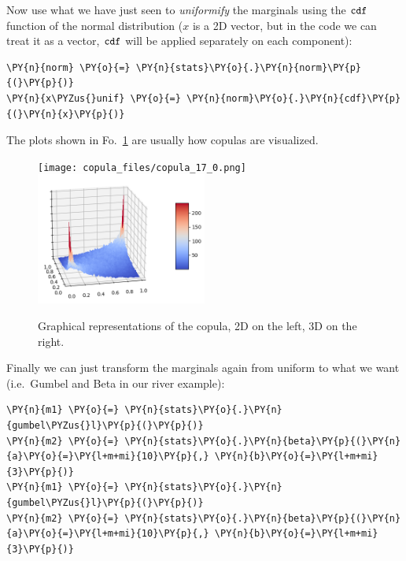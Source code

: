     Now use what we have just seen to \emph{uniformify} the marginals using
the \(\tt{cdf}\) function of the normal distribution (\(x\) is a 2D
vector, but in the code we can treat it as a vector, \(\tt{cdf}\) will
be applied separately on each component):

\begin{tcolorbox}[breakable, size=fbox, boxrule=1pt, pad at break*=1mm,colback=cellbackground, colframe=cellborder]
\begin{Verbatim}[commandchars=\\\{\}]
\PY{n}{norm} \PY{o}{=} \PY{n}{stats}\PY{o}{.}\PY{n}{norm}\PY{p}{(}\PY{p}{)}
\PY{n}{x\PYZus{}unif} \PY{o}{=} \PY{n}{norm}\PY{o}{.}\PY{n}{cdf}\PY{p}{(}\PY{n}{x}\PY{p}{)}
\end{Verbatim}
\end{tcolorbox}

The plots shown in Fo.~\ref{fig:copula} are usually how copulas are visualized.

    \begin{figure}
    \centering
    \texttt{[image: copula\_files/copula\_17\_0.png]}
    \quad
    \includegraphics[width=0.5\textwidth]{copula_3d.png}
    \caption{Graphical representations of the copula, 2D on the left, 3D on the right.}
    \label{fig:copula}
    \end{figure}

Finally we can just transform the marginals again from uniform to what we want
(i.e.~Gumbel and Beta in our river example):

\begin{tcolorbox}[breakable, size=fbox, boxrule=1pt, pad at break*=1mm,colback=cellbackground, colframe=cellborder]
\begin{Verbatim}[commandchars=\\\{\}]
\PY{n}{m1} \PY{o}{=} \PY{n}{stats}\PY{o}{.}\PY{n}{gumbel\PYZus{}l}\PY{p}{(}\PY{p}{)}
\PY{n}{m2} \PY{o}{=} \PY{n}{stats}\PY{o}{.}\PY{n}{beta}\PY{p}{(}\PY{n}{a}\PY{o}{=}\PY{l+m+mi}{10}\PY{p}{,} \PY{n}{b}\PY{o}{=}\PY{l+m+mi}{3}\PY{p}{)}
\PY{n}{m1} \PY{o}{=} \PY{n}{stats}\PY{o}{.}\PY{n}{gumbel\PYZus{}l}\PY{p}{(}\PY{p}{)}
\PY{n}{m2} \PY{o}{=} \PY{n}{stats}\PY{o}{.}\PY{n}{beta}\PY{p}{(}\PY{n}{a}\PY{o}{=}\PY{l+m+mi}{10}\PY{p}{,} \PY{n}{b}\PY{o}{=}\PY{l+m+mi}{3}\PY{p}{)}
\end{Verbatim}
\end{tcolorbox}

